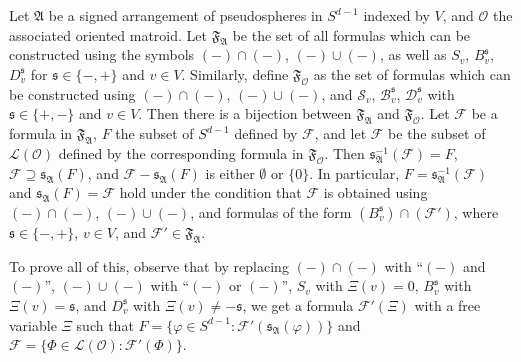 \documentclass[10pt,a4paper]{amsart}
\begin{document}
\begin{observation}\label{obs:curly-vs-print}
    Let $\mathfrak{A}$ be a signed arrangement of pseudospheres in $S^{d-1}$ indexed by $V$, and $\mathscr{O}$ the associated oriented matroid. Let $\mathfrak{F}_\mathfrak{A}$ be the set of all formulas which can be constructed using the symbols $(-)\cap(-)$, $(-)\cup(-)$, as well as $S_v$, $B^\mathfrak{s}_v$, $D^\mathfrak{s}_v$ for $\mathfrak{s}\in\{-,+\}$ and $v\in V$. Similarly, define $\mathfrak{F}_\mathscr{O}$ as the set of formulas which can be constructed using $(-)\cap(-)$, $(-)\cup(-)$, and $\mathscr{S}_v$, $\mathscr{B}^\mathfrak{s}_v$, $\mathscr{D}^\mathfrak{s}_v$ with $\mathfrak{s}\in\{+,-\}$ and $v\in V$. Then there is a bijection between $\mathfrak{F}_\mathfrak{A}$ and $\mathfrak{F}_\mathscr{O}$. Let $\mathcal{F}$ be a formula in $\mathfrak{F}_\mathfrak{A}$, $F$ the subset of $S^{d-1}$ defined by $\mathcal{F}$, and let $\mathscr{F}$ be the subset of $\mathscr{L}(\mathscr{O})$ defined by the corresponding formula in $\mathfrak{F}_\mathscr{O}$. Then $\mathfrak{s}_\mathfrak{A}^{-1}(\mathscr{F})=F$, $\mathscr{F}\supseteq \mathfrak{s}_\mathfrak{A}(F)$, and $\mathscr{F}-\mathfrak{s}_\mathfrak{A}(F)$ is either $\emptyset$ or $\{0\}$. In particular, $F=\mathfrak{s}_\mathfrak{A}^{-1}(\mathscr{F})$ and $\mathfrak{s}_\mathfrak{A}(F)=\mathscr{F}$ hold under the condition that $\mathcal{F}$ is obtained using $(-)\cap(-)$, $(-)\cup(-)$, and formulas of the form $(B^\mathfrak{s}_v)\cap(\mathcal{F}')$, where $\mathfrak{s}\in\{-,+\}$, $v\in V$, and $\mathcal{F}'\in\mathfrak{F}_\mathfrak{A}$.

    To prove all of this, observe that by replacing $(-)\cap(-)$ with ``$(-)$ and $(-)$'', $(-)\cup(-)$ with ``$(-)$ or $(-)$'', $S_v$ with $\Xi(v)=0$, $B^\mathfrak{s}_v$ with $\Xi(v)=\mathfrak{s}$, and $D^\mathfrak{s}_v$ with $\Xi(v)\neq -\mathfrak{s}$, we get a formula $\mathcal{F}'(\Xi)$ with a free variable $\Xi$ such that $F=\{\varphi\in S^{d-1}:\mathcal{F}'(\mathfrak{s}_\mathfrak{A}(\varphi))\}$ and $\mathscr{F}=\{\Phi\in\mathscr{L}(\mathscr{O}):\mathcal{F}'(\Phi)\}$.
\end{observation}  
\end{document}
